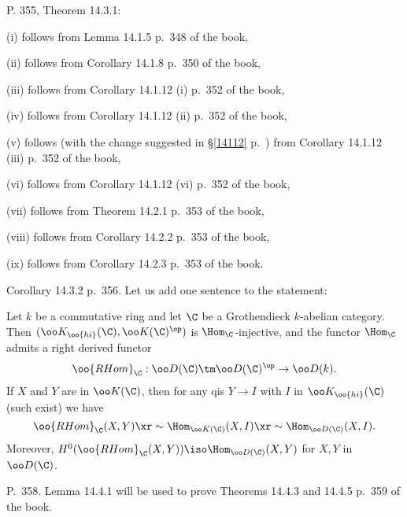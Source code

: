\documentclass[12pt]{article}
\theoremstyle{remark}
\theoremstyle{definition}
\begin{document}

\begin{s}
P. 355, Theorem 14.3.1: 

(i) follows from Lemma 14.1.5 p.~348 of the book, 

(ii) follows from Corollary 14.1.8 p.~350 of the book, 

(iii) follows from Corollary 14.1.12 (i) p.~352 of the book, 

(iv) follows from Corollary 14.1.12 (ii) p.~352 of the book, 

(v) follows (with the change suggested in \S\ref{14112} p.~) from Corollary 14.1.12 (iii) p.~352 of the book, 

(vi) follows from Corollary 14.1.12 (vi) p.~352 of the book,  

(vii) follows from Theorem 14.2.1 p.~353 of the book, 

(viii) follows from Corollary 14.2.2 p.~353 of the book, 

(ix) follows from Corollary 14.2.3 p.~353 of the book.
\end{s}

%

\begin{s}
Corollary 14.3.2 p.~356. Let us add one sentence to the statement:
\begin{cor}
Let $k$ be a commutative ring and let $\C$ be a Grothendieck $k$-abelian category. Then $(\oo K_{\oo{hi}}(\C),\oo K(\C)^{\op})$ is $\Hom_\C$-injective, and the functor $\Hom_\C$ admits a right derived functor 
$$
\oo{RHom}_\C:\oo D(\C)\tm\oo D(\C)^{\op}\to\oo D(k).
$$ 
If $X$ and $Y$ are in $\oo K(\C)$, then for any qis $Y\to I$ with $I$ in $\oo K_{\oo{hi}}(\C)$ (such exist) we have 
$$
\oo{RHom}_\C(X,Y)\xr\sim\Hom_{\oo K(\C)}(X,I)\xr\sim\Hom_{\oo D(\C)}(X,I).
$$ 
Moreover, $H^0(\oo{RHom}_\C(X,Y))\iso\Hom_{\oo D(\C)}(X,Y)$ for $X,Y$ in $\oo D(\C)$.
\end{cor}
\end{s}


\begin{s} 
P.~358. Lemma 14.4.1 will be used to prove Theorems 14.4.3 and 14.4.5 p.~359 of the book.
\end{s}
\end{document}
